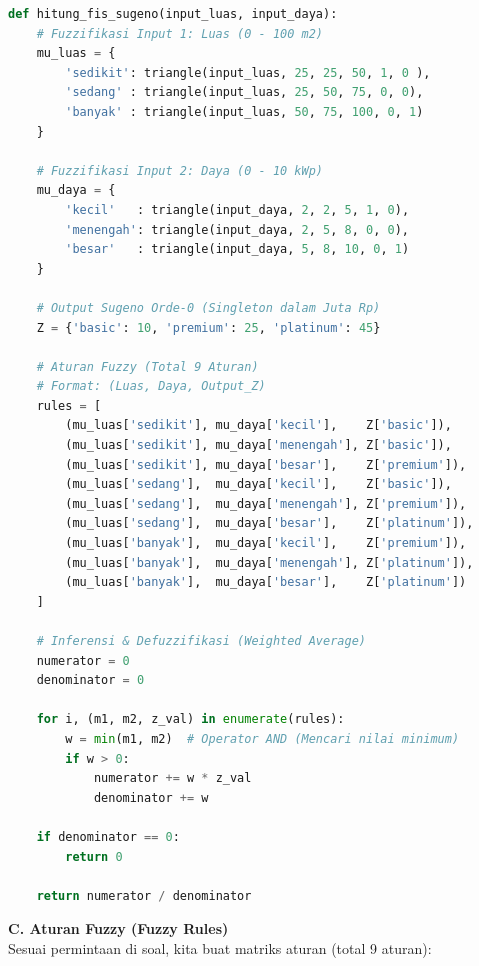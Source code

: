 \documentclass{article}
\begin{document}
\begin{lstlisting}[caption=Menghitung FIS Sugeno, language=Python]
def hitung_fis_sugeno(input_luas, input_daya):
    # Fuzzifikasi Input 1: Luas (0 - 100 m2)
    mu_luas = {
        'sedikit': triangle(input_luas, 25, 25, 50, 1, 0 ),
        'sedang' : triangle(input_luas, 25, 50, 75, 0, 0),
        'banyak' : triangle(input_luas, 50, 75, 100, 0, 1)
    }

    # Fuzzifikasi Input 2: Daya (0 - 10 kWp)
    mu_daya = {
        'kecil'   : triangle(input_daya, 2, 2, 5, 1, 0),
        'menengah': triangle(input_daya, 2, 5, 8, 0, 0),
        'besar'   : triangle(input_daya, 5, 8, 10, 0, 1)    
    }

    # Output Sugeno Orde-0 (Singleton dalam Juta Rp)
    Z = {'basic': 10, 'premium': 25, 'platinum': 45}

    # Aturan Fuzzy (Total 9 Aturan)
    # Format: (Luas, Daya, Output_Z)
    rules = [
        (mu_luas['sedikit'], mu_daya['kecil'],    Z['basic']),
        (mu_luas['sedikit'], mu_daya['menengah'], Z['basic']),
        (mu_luas['sedikit'], mu_daya['besar'],    Z['premium']),
        (mu_luas['sedang'],  mu_daya['kecil'],    Z['basic']),
        (mu_luas['sedang'],  mu_daya['menengah'], Z['premium']),
        (mu_luas['sedang'],  mu_daya['besar'],    Z['platinum']),
        (mu_luas['banyak'],  mu_daya['kecil'],    Z['premium']),
        (mu_luas['banyak'],  mu_daya['menengah'], Z['platinum']),
        (mu_luas['banyak'],  mu_daya['besar'],    Z['platinum'])
    ]

    # Inferensi & Defuzzifikasi (Weighted Average)
    numerator = 0
    denominator = 0

    for i, (m1, m2, z_val) in enumerate(rules):
        w = min(m1, m2)  # Operator AND (Mencari nilai minimum)
        if w > 0:
            numerator += w * z_val
            denominator += w

    if denominator == 0:
        return 0

    return numerator / denominator
\end{lstlisting}

\textbf{C. Aturan Fuzzy (Fuzzy Rules)}\\
Sesuai permintaan di soal, kita buat matriks aturan (total 9 aturan):\\
\end{document}
